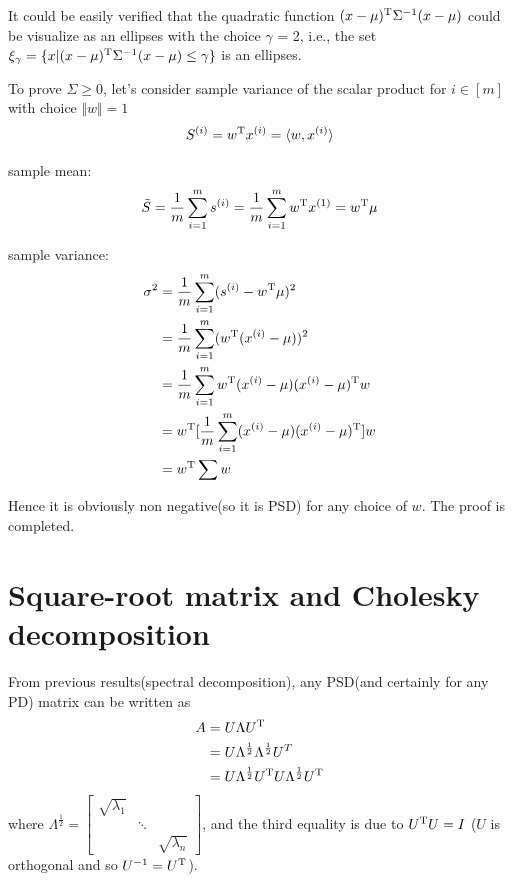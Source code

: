 \begin{example}
It could be easily verified that the quadratic function $(x - \mu)^{{\rm T}} \Sigma^{-1}(x - \mu)$ could be visualize as an ellipses with the choice $\gamma$ = 2, i.e., the set $\xi_{\gamma} = \{x | (x - \mu)^{{\rm T}} \Sigma^{-1}(x - \mu)\leq \gamma \}$ is an ellipses.


To prove $\Sigma\geq 0$, let's consider sample variance of the scalar product for $i\in [m]$ with choice $\Vert w\Vert=1$
$$S^{(i)} =w^{{\rm T}}x^{(i)} =\langle w, x^{(i)}\rangle$$

sample mean:
$$\tilde{S} = \frac{1}{m}\sum^m_{i=1}s^{(i)} = \frac{1}{m}\sum^m_{i=1}w^{{\rm T}}x^{(1)} = w^{{\rm T}}\mu$$

sample variance: 
\begin{align*}
\sigma^2 &= \frac{1}{m}\sum^m_{i=1}(s^{(i)} - w^{{\rm T}}\mu)^2 \\
&= \frac{1}{m}\sum^m_{i=1}(w^{{\rm T}}(x^{(i)} -\mu))^2\\
&=\frac{1}{m}\sum^m_{i=1}w^{{\rm T}}(x^{(i)}-\mu)(x^{(i)}-\mu)^{{\rm T}}w\\
&= w^{{\rm T}}[\frac{1}{m}\sum^m_{i=1}(x^{(i)}-\mu)(x^{(i)}-\mu)^{{\rm T}}]w\\
&= w^{{\rm T}}\sum w
\end{align*}

Hence it is obviously non negative(so it is PSD) for any choice of $w$. The proof is completed.
\end{example}

\section{Square-root matrix and Cholesky decomposition}

From previous results(spectral decomposition), any PSD(and certainly for any PD) matrix can be written as
\begin{align*}
A &= U\Lambda U^{{\rm T}} \\
&=U\Lambda^{\frac{1}{2}}\Lambda^{\frac{1}{2}}U^{T}\\
&= U\Lambda^{\frac{1}{2}}U^{{\rm T}}U\Lambda^{\frac{1}{2}}U^{{\rm T}}
\end{align*}
where $\Lambda^{\frac{1}{2}}=
\begin{bmatrix}%
	\sqrt{\lambda_1}& & \\
	 &\ddots& \\
	 & &\sqrt{\lambda_n}
\end{bmatrix}$,
and the third equality is due to $U^{{\rm T}}U=I$ ($U$ is orthogonal and so $U^{-1}=U^{{\rm T}}$).



